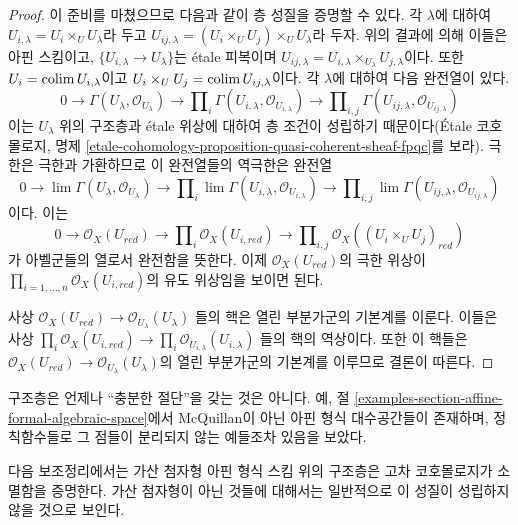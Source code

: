 \begin{proof}
\medskip\noindent
이 준비를 마쳤으므로 다음과 같이 층 성질을 증명할 수 있다.
각 $\lambda$에 대하여
$U_{i, \lambda} = U_i \times_U U_\lambda$라 두고
$U_{ij, \lambda} = (U_i \times_U U_j) \times_U U_\lambda$라 두자.
위의 결과에 의해 이들은 아핀 스킴이고,
$\{U_{i, \lambda} \to U_\lambda\}$는 \'etale 피복이며
$U_{ij, \lambda} = U_{i, \lambda} \times_{U_\lambda} U_{j, \lambda}$이다.
또한 $U_i = \mathop{\mathrm{colim}}\nolimits U_{i, \lambda}$이고
$U_i \times_U U_j = \mathop{\mathrm{colim}}\nolimits U_{ij, \lambda}$이다.
각 $\lambda$에 대하여 다음 완전열이 있다.
$$
0 \to
\Gamma(U_\lambda, \mathcal{O}_{U_\lambda}) \to
\prod\nolimits_i \Gamma(U_{i, \lambda}, \mathcal{O}_{U_{i, \lambda}}) \to
\prod\nolimits_{i, j} \Gamma(U_{ij, \lambda}, \mathcal{O}_{U_{ij, \lambda}})
$$
이는 $U_\lambda$ 위의 구조층과 \'etale 위상에 대하여 층 조건이
성립하기 때문이다(\'Etale 코호몰로지, 명제
\ref{etale-cohomology-proposition-quasi-coherent-sheaf-fpqc}를 보라).
극한은 극한과 가환하므로 이 완전열들의 역극한은 완전열
$$
0 \to
\lim \Gamma(U_\lambda, \mathcal{O}_{U_\lambda}) \to
\prod\nolimits_i \lim \Gamma(U_{i, \lambda}, \mathcal{O}_{U_{i, \lambda}}) \to
\prod\nolimits_{i, j} \lim
\Gamma(U_{ij, \lambda}, \mathcal{O}_{U_{ij, \lambda}})
$$
이다. 이는
$$
0 \to
\mathcal{O}_X(U_{red}) \to
\prod\nolimits_i \mathcal{O}_X(U_{i, red}) \to
\prod\nolimits_{i, j} \mathcal{O}_X((U_i \times_U U_j)_{red})
$$
가 아벨군들의 열로서 완전함을 뜻한다. 이제
$\mathcal{O}_X(U_{red})$의 극한 위상이
$\prod_{i = 1, \ldots, n} \mathcal{O}_X(U_{i, red})$의
유도 위상임을 보이면 된다.
\par\noindent
사상
$\mathcal{O}_X(U_{red}) \to \mathcal{O}_{U_\lambda}(U_\lambda)$
들의 핵은 열린 부분가군의 기본계를 이룬다. 이들은 사상
$\prod_i \mathcal{O}_X(U_{i, red}) \to
\prod_i \mathcal{O}_{U_{i, \lambda}}(U_{i, \lambda})$
들의 핵의 역상이다. 또한 이 핵들은
$\mathcal{O}_X(U_{red}) \to \mathcal{O}_{U_\lambda}(U_\lambda)$의
열린 부분가군의 기본계를 이루므로 결론이 따른다.
\end{proof}

\begin{remark}
\label{remark-not-enough-sections}
구조층은 언제나 “충분한 절단”을 갖는 것은 아니다.
예, 절 \ref{examples-section-affine-formal-algebraic-space}에서
McQuillan이 아닌 아핀 형식 대수공간들이 존재하며, 정칙함수들로
그 점들이 분리되지 않는 예들조차 있음을 보았다.
\end{remark}

\noindent
다음 보조정리에서는 가산 첨자형 아핀 형식 스킴 위의 구조층은 고차
코호몰로지가 소멸함을 증명한다. 가산 첨자형이 아닌 것들에 대해서는
일반적으로 이 성질이 성립하지 않을 것으로 보인다.

